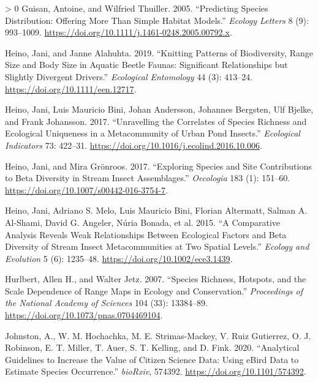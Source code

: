 \documentclass[10pt,oneside]{article}
\newlength{\cslhangindent}
\newenvironment{CSLReferences}[3] %
 {%
  \setlength{\parindent}{0pt}
  \ifodd #1 \everypar{\setlength{\hangindent}{\cslhangindent}}\ignorespaces\fi
  \ifnum #2 > 0
  \setlength{\parskip}{#2\baselineskip}
  \fi
 }%
 {}
\begin{document}
\begin{CSLReferences}{1}{0}
\leavevmode\hypertarget{ref-Guisan2005PreSpe}{}%
Guisan, Antoine, and Wilfried Thuiller. 2005. {``Predicting Species
Distribution: Offering More Than Simple Habitat Models.''} \emph{Ecology
Letters} 8 (9): 993--1009.
\url{https://doi.org/10.1111/j.1461-0248.2005.00792.x}.

\leavevmode\hypertarget{ref-Heino2019KniPat}{}%
Heino, Jani, and Janne Alahuhta. 2019. {``Knitting Patterns of
Biodiversity, Range Size and Body Size in Aquatic Beetle Faunas:
Significant Relationships but Slightly Divergent Drivers.''}
\emph{Ecological Entomology} 44 (3): 413--24.
\url{https://doi.org/10.1111/een.12717}.

\leavevmode\hypertarget{ref-Heino2017UnrCor}{}%
Heino, Jani, Luis Mauricio Bini, Johan Andersson, Johannes Bergsten, Ulf
Bjelke, and Frank Johansson. 2017. {``Unravelling the Correlates of
Species Richness and Ecological Uniqueness in a Metacommunity of Urban
Pond Insects.''} \emph{Ecological Indicators} 73: 422--31.
\url{https://doi.org/10.1016/j.ecolind.2016.10.006}.

\leavevmode\hypertarget{ref-Heino2017ExpSpe}{}%
Heino, Jani, and Mira Grönroos. 2017. {``Exploring Species and Site
Contributions to Beta Diversity in Stream Insect Assemblages.''}
\emph{Oecologia} 183 (1): 151--60.
\url{https://doi.org/10.1007/s00442-016-3754-7}.

\leavevmode\hypertarget{ref-Heino2015ComAna}{}%
Heino, Jani, Adriano S. Melo, Luis Mauricio Bini, Florian Altermatt,
Salman A. Al-Shami, David G. Angeler, Núria Bonada, et al. 2015. {``A
Comparative Analysis Reveals Weak Relationships Between Ecological
Factors and Beta Diversity of Stream Insect Metacommunities at Two
Spatial Levels.''} \emph{Ecology and Evolution} 5 (6): 1235--48.
\url{https://doi.org/10.1002/ece3.1439}.

\leavevmode\hypertarget{ref-Hurlbert2007SpeRic}{}%
Hurlbert, Allen H., and Walter Jetz. 2007. {``Species Richness,
Hotspots, and the Scale Dependence of Range Maps in Ecology and
Conservation.''} \emph{Proceedings of the National Academy of Sciences}
104 (33): 13384--89. \url{https://doi.org/10.1073/pnas.0704469104}.

\leavevmode\hypertarget{ref-Johnston2020AnaGui}{}%
Johnston, A., W. M. Hochachka, M. E. Strimas-Mackey, V. Ruiz Gutierrez,
O. J. Robinson, E. T. Miller, T. Auer, S. T. Kelling, and D. Fink. 2020.
{``Analytical Guidelines to Increase the Value of Citizen Science Data:
Using eBird Data to Estimate Species Occurrence.''} \emph{bioRxiv},
574392. \url{https://doi.org/10.1101/574392}.


\end{CSLReferences}
\end{document}
